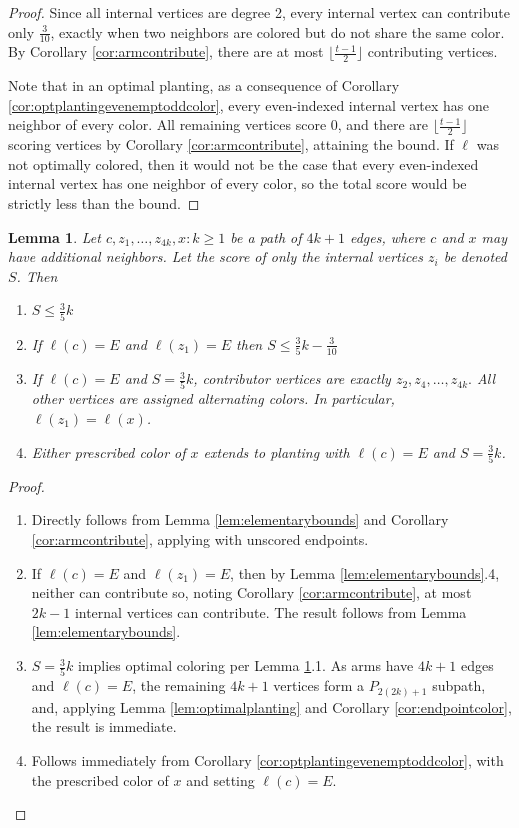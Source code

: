 \documentclass[11pt]{article}
\theoremstyle{plain}
\newtheorem{lemma}[theorem]{Lemma}
\begin{document}
\begin{proof}
    Since all internal vertices are degree 2, every internal vertex can contribute only $\frac{3}{10}$, exactly when two neighbors are colored but do not share the same color. By Corollary \ref{cor:armcontribute}, there are at most $\lfloor \frac{t-1}{2} \rfloor$ contributing vertices.
    
    Note that in an optimal planting, as a consequence of Corollary \ref{cor:optplantingevenemptoddcolor}, every even-indexed internal vertex has one neighbor of every color. All remaining vertices score $0$, and there are $\lfloor \frac{t-1}{2} \rfloor$ scoring vertices by Corollary \ref{cor:armcontribute}, attaining the bound. If $\ell$ was not optimally colored, then it would not be the case that every even-indexed internal vertex has one neighbor of every color, so the total score would be strictly less than the bound. 
\end{proof}


\begin{lemma} \label{lem:armlemmas}
    Let $c, z_1, \dots, z_{4k}, x:k \geq 1$ be a path of $4k+1$ edges, where $c$ and $x$ may have additional neighbors. Let the score of only the internal vertices $z_i$ be denoted $S$. Then
    \begin{enumerate}
        \item $S \leq \frac{3}{5} k$
        \item If $\ell(c)=E$ and $\ell(z_1)=E$ then $S \leq \frac{3}{5}k-\frac{3}{10}$
        \item If $\ell(c) = E$ and $S = \frac{3}{5}k$, contributor vertices are exactly $z_2,z_4, \dots, z_{4k}.$ All other vertices are assigned alternating colors. In particular, $\ell(z_1) = \ell(x)$.
        \item Either prescribed color of $x$ extends to planting with $\ell(c) = E$ and $S = \frac{3}{5}k$.
    \end{enumerate}
\end{lemma}

\begin{proof}
\text{ }
\begin{enumerate}
    \item Directly follows from Lemma \ref{lem:elementarybounds} and Corollary \ref{cor:armcontribute}, applying with unscored endpoints. 
    \item If $\ell(c)=E$ and $\ell(z_1)=E$, then by Lemma \ref{lem:elementarybounds}.4, neither can contribute so, noting Corollary \ref{cor:armcontribute}, at most $2k-1$ internal vertices can contribute. The result follows from Lemma \ref{lem:elementarybounds}.
    \item $S = \frac{3}{5}k$ implies optimal coloring per Lemma \ref{lem:armlemmas}.1. As arms have $4k+1$ edges and $\ell(c) = E$, the remaining $4k+1$ vertices form a $P_{2(2k)+1}$ subpath, and, applying Lemma \ref{lem:optimalplanting} and Corollary \ref{cor:endpointcolor}, the result is immediate.
    \item Follows immediately from Corollary \ref{cor:optplantingevenemptoddcolor}, with the prescribed color of $x$ and setting $\ell(c) = E$.
\end{enumerate}
\end{proof}
\end{document}
